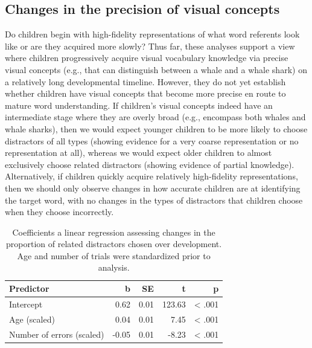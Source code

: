 \documentclass[
  man,mask]{apa6}
\begin{document}
\subsection{Changes in the precision of visual concepts}\label{changes-in-the-precision-of-visual-concepts}

Do children begin with high-fidelity representations of what word referents look like or are they acquired more slowly? Thus far, these analyses support a view where children progressively acquire visual vocabulary knowledge via precise visual concepts (e.g., that can distinguish between a whale and a whale shark) on a relatively long developmental timeline. However, they do not yet establish whether children have visual concepts that become more precise en route to mature word understanding. If children's visual concepts indeed have an intermediate stage where they are overly broad (e.g., encompass both whales and whale sharks), then we would expect younger children to be more likely to choose distractors of all types (showing evidence for a very coarse representation or no representation at all), whereas we would expect older children to almost exclusively choose related distractors (showing evidence of partial knowledge). Alternatively, if children quickly acquire relatively high-fidelity representations, then we should only observe changes in how accurate children are at identifying the target word, with no changes in the types of distractors that children choose when they choose incorrectly.

\begin{table}
\centering
\caption{\label{tab:unnamed-chunk-22}Coefficients a linear regression assessing changes in the proportion of related distractors chosen over development. Age and number of trials were standardized prior to analysis.}
\centering
\begin{tabular}[t]{lrrrr}
\toprule
Predictor & b & SE & t & p\\
\midrule
Intercept & 0.62 & 0.01 & 123.63 & < .001\\
Age (scaled) & 0.04 & 0.01 & 7.45 & < .001\\
Number of errors (scaled) & -0.05 & 0.01 & -8.23 & < .001\\
\bottomrule
\end{tabular}
\end{table}
\end{document}
